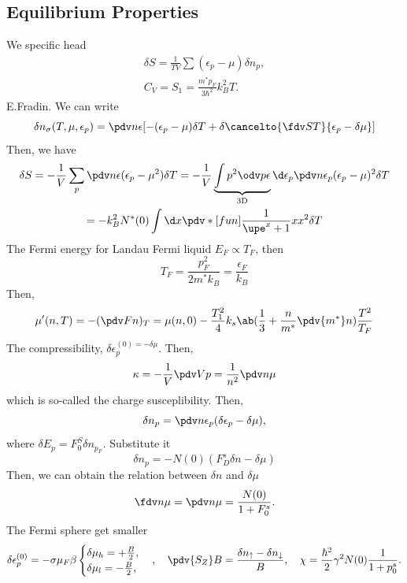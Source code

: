 \subsection{Equilibrium Properties}

We specific head
\begin{gather}
  \delta S = \frac1{TV} \sum(\epsilon_p - \mu) \delta n_p,\\
  C_V = S_1 = \frac{m^*p_F}{3\hbar^2} k_B^2T.
\end{gather}
E.Fradin. We can write
\begin{equation}
  \delta n_\sigma(T,\mu,\epsilon_p)
= \pdv n\epsilon [-(\epsilon_p -  \mu) \delta T + \delta \cancelto{\fdv ST}{\epsilon_p - \delta\mu}]
\end{equation}
Then, we have
\begin{multline}
  \delta S = -\frac1V \sum_p \pdv n\epsilon (\epsilon_p - \mu^2) \delta T
           = -\frac1V \underbrace{\int p^2 \odv p\epsilon}_\text{3D}
              \d\epsilon_p \pdv n\epsilon_p (\epsilon_p - \mu)^2 \delta T\\
= -k_B^2 N^*(0) \int \d x \pdv*[fun]{\frac1{\upe^x + 1}}x x^2 \delta T
\end{multline}
The Fermi energy for Landau Fermi liquid $E_F \propto T_F$, then
\begin{equation}
  T_F = \frac{p_F^2}{2m^*k_B} = \frac{\epsilon_F}{k_B}
\end{equation}
Then,
\begin{equation}
  \mu'(n, T) = -(\pdv Fn)_T = \mu(n,0)
- \frac{T_1^2}{4} k_s\ab(\frac13 + \frac n{m^*} \pdv{m^*}n) \frac{T^2}{T_F}
\end{equation}
The compressibility, $\delta \epsilon_p^{(0) = -\delta\mu}$. Then,
\begin{equation}
  \kappa = -\frac1V \pdv Vp = \frac1{n^2} \pdv n\mu
\end{equation}
which is so-called the charge susceplibility. Then,
\[
  \delta n_p = \pdv n{\epsilon_p} (\delta\epsilon_p - \delta\mu),
\]
where $\delta E_p = F_0^S \delta n_{p_F}$. Substitute it
\begin{equation}
  \delta n_p = -N(0) (F_D^s \delta n - \delta \mu)
\end{equation}
Then, we can obtain the relation between $\delta n$ and $\delta\mu$
\begin{equation}
  \fdv n\mu = \pdv n\mu = \frac{N(0)}{1 + F_0^s}.
\end{equation}
The Fermi sphere get smaller
\[
  \delta \epsilon_p^{(0)} = -\sigma \mu_F \beta
  \begin{cases}
    \delta \mu_h = + \frac B2,\\
    \delta \mu_l = - \frac B2,\\
  \end{cases}, \quad
  \pdv{S_Z}B = \frac{\delta n_\uparrow - \delta n_\downarrow}{B}, \quad
  \chi = \frac{\hbar^2}{2} \gamma^2 N(0) \frac{1}{1 + p_0^s}.
\]

